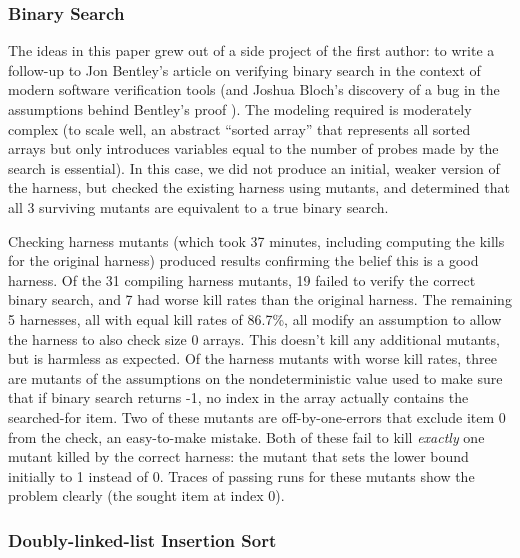 \documentclass[conference]{IEEEtran}
\begin{document}
\subsubsection{Binary Search}

The ideas in this paper grew out of a side project of the first
author: to write a follow-up to Jon Bentley's article on verifying
binary search \cite{Bentley} in the context of modern software
verification tools (and Joshua Bloch's discovery of a bug in the
assumptions behind Bentley's proof \cite{Bloch}).  The modeling
required is moderately complex (to scale well, an abstract ``sorted
array'' that represents all sorted arrays but only introduces
variables equal to the number of probes made by the search is
essential).  In this case, we did not produce an initial, weaker
version of the harness, but checked the existing harness using
mutants, and determined that all 3 surviving mutants are equivalent to
a true binary search.

Checking harness mutants (which took 37 minutes, including computing
the kills for the original harness) produced results confirming the belief this is a
good harness.  Of the 31 compiling harness mutants, 19 failed to verify
the correct binary search, and 7 had worse kill rates than the
original harness.  The remaining 5 harnesses, all with equal kill
rates of 86.7\%, all modify an assumption to allow the harness to also
check size 0 arrays.  This doesn't kill any additional mutants, but is
harmless as expected.  Of the harness mutants with worse kill rates,
three are mutants of the assumptions on the nondeterministic value used to
make sure that if binary search returns -1, no index in the array
actually contains the searched-for item.  Two of these mutants are
off-by-one-errors that exclude item 0 from the check, an easy-to-make
mistake.  Both of these fail to kill \emph{exactly} one mutant killed by the
correct harness: the mutant that sets the lower bound
initially to 1 instead of 0.  Traces of passing runs for these mutants show the
problem clearly (the sought item at index 0).

\subsubsection{Doubly-linked-list Insertion Sort}
\end{document}

